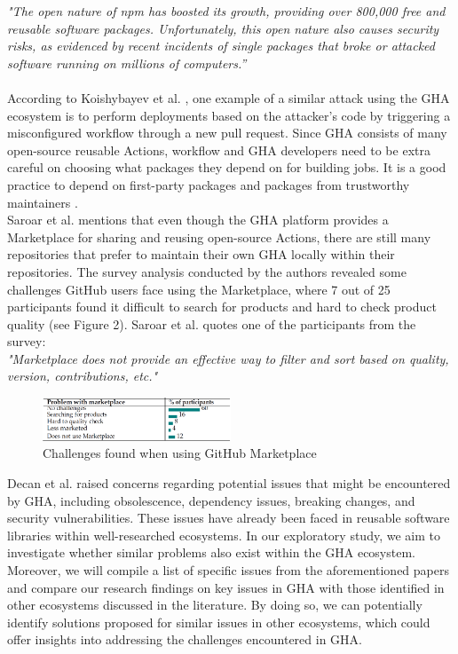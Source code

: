 \documentclass[conference]{IEEEtran}
\begin{document}
        \textit{"The open nature of npm has boosted its growth, providing over 800,000 free and reusable software packages. Unfortunately, this open nature also causes security risks, as evidenced by recent incidents of single packages that broke or attacked software running on millions of computers.”} \\\\
According to Koishybayev et al. \cite{koishybayev2022characterizing}, one example of a similar attack using the GHA ecosystem is to perform deployments based on the attacker’s code by triggering a misconfigured workflow through a new pull request. Since GHA consists of many open-source reusable Actions, workflow and GHA developers need to be extra careful on choosing what packages they depend on for building jobs. It is a good practice to depend on first-party packages and packages from trustworthy maintainers \cite{zimmermann2019small}. \\

        Saroar et al. \cite{saroar2023developers} mentions that even though the GHA platform provides a Marketplace for sharing and reusing open-source Actions, there are still many repositories that prefer to maintain their own GHA locally within their repositories. The survey analysis conducted by the authors revealed some challenges GitHub users face using the Marketplace, where 7 out of 25 participants found it difficult to search for products and hard to check product quality (see Figure 2). Saroar et al. \cite{saroar2023developers} quotes one of the participants from the survey: \\

\textit{"Marketplace does not provide an effective way to filter and sort based on quality, version, contributions, etc."}\\

\begin{figure} [H]
\includegraphics[width=0.5\textwidth]{Table 1.png}
\caption{Challenges found when using GitHub Marketplace \cite{saroar2023developers} }
\end{figure}

	Decan et al. \cite{decan2022use} raised concerns regarding potential issues that might be encountered by GHA, including obsolescence, dependency issues, breaking changes, and security vulnerabilities. These issues have already been faced in reusable software libraries within well-researched ecosystems. In our exploratory study, we aim to investigate whether similar problems also exist within the GHA ecosystem. Moreover, we will compile a list of specific issues from the aforementioned papers and compare our research findings on key issues in GHA with those identified in other ecosystems discussed in the literature. By doing so, we can potentially identify solutions proposed for similar issues in other ecosystems, which could offer insights into addressing the challenges encountered in GHA.
\end{document}
